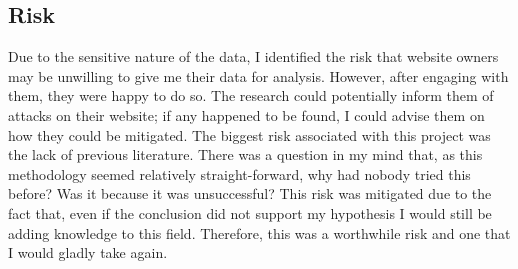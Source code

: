 \subsection{Risk}

Due to the sensitive nature of the data, I identified the risk that website owners may be unwilling to give me their data for analysis. However, after engaging with them, they were happy to do so. The research could potentially inform them of attacks on their website; if any happened to be found, I could advise them on how they could be mitigated. The biggest risk associated with this project was the lack of previous literature. There was a question in my mind that, as this methodology seemed relatively straight-forward, why had nobody tried this before? Was it because it was unsuccessful? This risk was mitigated due to the fact that, even if the conclusion did not support my hypothesis I would still be adding knowledge to this field. Therefore, this was a worthwhile risk and one that I would gladly take again.